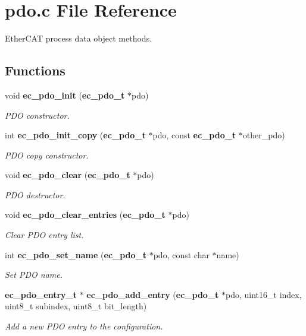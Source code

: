 \section{pdo.\-c File Reference}
\label{pdo_8c}


Ether\-C\-A\-T process data object methods.  


\subsection*{Functions}
\begin{DoxyCompactItemize}
\item 
void {\bf ec\-\_\-pdo\-\_\-init} ({\bf ec\-\_\-pdo\-\_\-t} $\ast$pdo)
\begin{DoxyCompactList}\small\item\em P\-D\-O constructor. \end{DoxyCompactList}\item 
int {\bf ec\-\_\-pdo\-\_\-init\-\_\-copy} ({\bf ec\-\_\-pdo\-\_\-t} $\ast$pdo, const {\bf ec\-\_\-pdo\-\_\-t} $\ast$other\-\_\-pdo)
\begin{DoxyCompactList}\small\item\em P\-D\-O copy constructor. \end{DoxyCompactList}\item 
void {\bf ec\-\_\-pdo\-\_\-clear} ({\bf ec\-\_\-pdo\-\_\-t} $\ast$pdo)
\begin{DoxyCompactList}\small\item\em P\-D\-O destructor. \end{DoxyCompactList}\item 
void {\bf ec\-\_\-pdo\-\_\-clear\-\_\-entries} ({\bf ec\-\_\-pdo\-\_\-t} $\ast$pdo)
\begin{DoxyCompactList}\small\item\em Clear P\-D\-O entry list. \end{DoxyCompactList}\item 
int {\bf ec\-\_\-pdo\-\_\-set\-\_\-name} ({\bf ec\-\_\-pdo\-\_\-t} $\ast$pdo, const char $\ast$name)
\begin{DoxyCompactList}\small\item\em Set P\-D\-O name. \end{DoxyCompactList}\item 
{\bf ec\-\_\-pdo\-\_\-entry\-\_\-t} $\ast$ {\bf ec\-\_\-pdo\-\_\-add\-\_\-entry} ({\bf ec\-\_\-pdo\-\_\-t} $\ast$pdo, uint16\-\_\-t index, uint8\-\_\-t subindex, uint8\-\_\-t bit\-\_\-length)
\begin{DoxyCompactList}\small\item\em Add a new P\-D\-O entry to the configuration. \end{DoxyCompactList}\item 

\end{DoxyCompactItemize}
